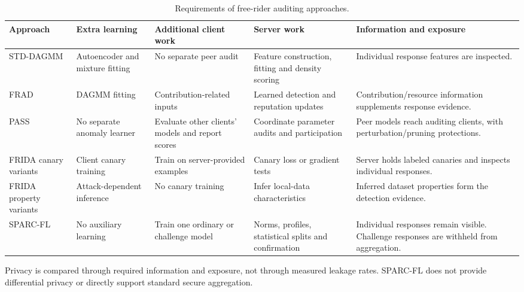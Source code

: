 \begin{table}[t]\centering\footnotesize
\renewcommand{\arraystretch}{1.1}
\caption{Requirements of free-rider auditing approaches.}\label{tab:method-comparison}
\begin{tabular}{>{\raggedright\arraybackslash}p{2.0cm}>{\raggedright\arraybackslash}p{2.0cm}>{\raggedright\arraybackslash}p{2.7cm}>{\raggedright\arraybackslash}p{3.6cm}>{\raggedright\arraybackslash}p{5.0cm}}\toprule
Approach & Extra learning & Additional client work & Server work & Information and exposure \\ \midrule
STD-DAGMM~\cite{lin2019freeriders} & Autoencoder and mixture fitting & No separate peer audit & Feature construction, fitting and density scoring & Individual response features are inspected. \\
FRAD~\cite{wang2024frad} & DAGMM fitting & Contribution-related inputs & Learned detection and reputation updates & Contribution/resource information supplements response evidence. \\
PASS~\cite{wang2024pass} & No separate anomaly learner & Evaluate other clients' models and report scores & Coordinate parameter audits and participation & Peer models reach auditing clients, with perturbation/pruning protections. \\
FRIDA canary variants~\cite{recasens2026frida} & Client canary training & Train on server-provided examples & Canary loss or gradient tests & Server holds labeled canaries and inspects individual responses. \\
FRIDA property variants~\cite{recasens2026frida} & Attack-dependent inference & No canary training & Infer local-data characteristics & Inferred dataset properties form the detection evidence. \\
SPARC-FL & No auxiliary learning & Train one ordinary or challenge model & Norms, profiles, statistical splits and confirmation & Individual responses remain visible. Challenge responses are withheld from aggregation. \\
\bottomrule\end{tabular}
\par\smallskip\parbox{0.97\textwidth}{\scriptsize Privacy is compared through required information and exposure, not through measured leakage rates. SPARC-FL does not provide differential privacy or directly support standard secure aggregation.}
\end{table}
